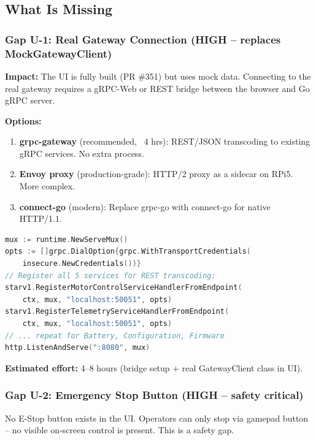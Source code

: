 \documentclass[12pt,a4paper]{article}
\begin{document}
\subsection{What Is Missing}

\subsubsection{Gap U-1: Real Gateway Connection (HIGH -- replaces MockGatewayClient)}

\begin{criticalbox}
  \textbf{Impact:} The UI is fully built (PR \#351) but uses mock data. Connecting to the real
  gateway requires a gRPC-Web or REST bridge between the browser and Go gRPC server.
\end{criticalbox}

\textbf{Options:}
\begin{enumerate}[noitemsep]
  \item \textbf{grpc-gateway} (recommended, ~4 hrs): REST/JSON transcoding to existing gRPC services. No extra process.
  \item \textbf{Envoy proxy} (production-grade): HTTP/2 proxy as a sidecar on RPi5. More complex.
  \item \textbf{connect-go} (modern): Replace grpc-go with connect-go for native HTTP/1.1.
\end{enumerate}

\begin{lstlisting}[language=Go, caption={grpc-gateway setup in cmd/star-gateway/main.go}]
mux := runtime.NewServeMux()
opts := []grpc.DialOption{grpc.WithTransportCredentials(
    insecure.NewCredentials())}
// Register all 5 services for REST transcoding:
starv1.RegisterMotorControlServiceHandlerFromEndpoint(
    ctx, mux, "localhost:50051", opts)
starv1.RegisterTelemetryServiceHandlerFromEndpoint(
    ctx, mux, "localhost:50051", opts)
// ... repeat for Battery, Configuration, Firmware
http.ListenAndServe(":8080", mux)
\end{lstlisting}

\textbf{Estimated effort:} 4--8 hours (bridge setup + real GatewayClient class in UI).

\subsubsection{Gap U-2: Emergency Stop Button (HIGH -- safety critical)}

\begin{criticalbox}
  No E-Stop button exists in the UI. Operators can only stop via gamepad button --
  no visible on-screen control is present. This is a safety gap.
\end{criticalbox}
\end{document}
